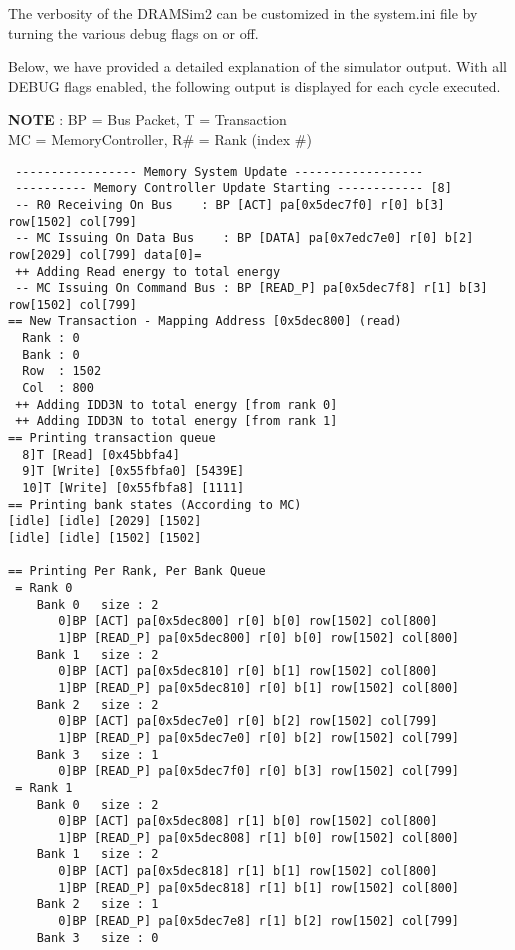 \documentclass[11pt]{article}
\begin{document}
\noindent\begin{minipage}{\textwidth}
The verbosity of the DRAMSim2 can be customized in the system.ini file by turning the
various debug flags on or off. 

Below, we have provided a detailed explanation of the simulator output.  With
all DEBUG flags enabled, the following output is displayed for each cycle
executed.  

   \textbf{NOTE} : BP = Bus Packet, T  = Transaction \\ 
          MC = MemoryController, R\# = Rank (index \#)
  
\begin{lstlisting}
 ----------------- Memory System Update ------------------
 ---------- Memory Controller Update Starting ------------ [8]
 -- R0 Receiving On Bus    : BP [ACT] pa[0x5dec7f0] r[0] b[3] row[1502] col[799]
 -- MC Issuing On Data Bus    : BP [DATA] pa[0x7edc7e0] r[0] b[2] row[2029] col[799] data[0]=
 ++ Adding Read energy to total energy
 -- MC Issuing On Command Bus : BP [READ_P] pa[0x5dec7f8] r[1] b[3] row[1502] col[799]
== New Transaction - Mapping Address [0x5dec800] (read)
  Rank : 0
  Bank : 0
  Row  : 1502
  Col  : 800
 ++ Adding IDD3N to total energy [from rank 0]
 ++ Adding IDD3N to total energy [from rank 1]
== Printing transaction queue
  8]T [Read] [0x45bbfa4]
  9]T [Write] [0x55fbfa0] [5439E]
  10]T [Write] [0x55fbfa8] [1111]
== Printing bank states (According to MC)
[idle] [idle] [2029] [1502] 
[idle] [idle] [1502] [1502] 

== Printing Per Rank, Per Bank Queue
 = Rank 0
    Bank 0   size : 2
       0]BP [ACT] pa[0x5dec800] r[0] b[0] row[1502] col[800]
       1]BP [READ_P] pa[0x5dec800] r[0] b[0] row[1502] col[800]
    Bank 1   size : 2
       0]BP [ACT] pa[0x5dec810] r[0] b[1] row[1502] col[800]
       1]BP [READ_P] pa[0x5dec810] r[0] b[1] row[1502] col[800]
    Bank 2   size : 2
       0]BP [ACT] pa[0x5dec7e0] r[0] b[2] row[1502] col[799]
       1]BP [READ_P] pa[0x5dec7e0] r[0] b[2] row[1502] col[799]
    Bank 3   size : 1
       0]BP [READ_P] pa[0x5dec7f0] r[0] b[3] row[1502] col[799]
 = Rank 1
    Bank 0   size : 2
       0]BP [ACT] pa[0x5dec808] r[1] b[0] row[1502] col[800]
       1]BP [READ_P] pa[0x5dec808] r[1] b[0] row[1502] col[800]
    Bank 1   size : 2
       0]BP [ACT] pa[0x5dec818] r[1] b[1] row[1502] col[800]
       1]BP [READ_P] pa[0x5dec818] r[1] b[1] row[1502] col[800]
    Bank 2   size : 1
       0]BP [READ_P] pa[0x5dec7e8] r[1] b[2] row[1502] col[799]
    Bank 3   size : 0
\end{lstlisting}
\end{minipage}
\end{document}
